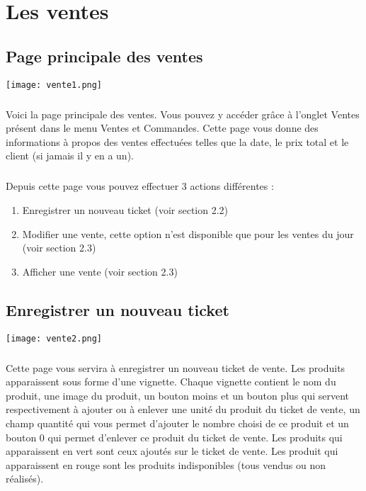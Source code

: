 \chapter{Les ventes}

\section{Page principale des ventes}

\texttt{[image: vente1.png]}

\paragraph{} Voici la page principale des ventes. Vous pouvez y accéder grâce à
l'onglet Ventes présent dans le menu Ventes et Commandes. Cette page vous donne
des informations à propos des ventes effectuées telles que la date, le prix
total et le client (si jamais il y en a un).

\paragraph{} Depuis cette page vous pouvez effectuer 3 actions différentes :
\begin{enumerate} 
    \item Enregistrer un nouveau ticket (voir section 2.2) 
    \item Modifier une vente, cette option n'est disponible que pour les ventes
    du jour (voir section 2.3) 
    \item Afficher une vente (voir section 2.3) 
\end{enumerate}

\section{Enregistrer un nouveau ticket}

\texttt{[image: vente2.png]}

\paragraph{} Cette page vous servira à enregistrer un nouveau ticket de vente.
Les produits apparaissent sous forme d'une vignette. Chaque vignette contient
le nom du produit, une image du produit, un bouton moins et un bouton plus qui
servent respectivement à ajouter ou à enlever une unité du produit du ticket de
vente, un champ quantité qui vous permet d'ajouter le nombre choisi de ce
produit et un bouton 0 qui permet d'enlever ce produit du ticket de vente. Les
produits qui apparaissent en vert sont ceux ajoutés sur le ticket de vente. Les
produit qui apparaissent en rouge sont les produits indisponibles (tous vendus
ou non réalisés).

